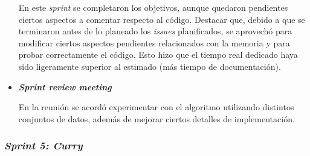 \begin{itemize}
	En este \textit{sprint} se completaron los objetivos, aunque quedaron pendientes ciertos aspectos a comentar respecto al código. Destacar que, debido a que se terminaron antes de lo planeado los \textit{issues} planificados, se aprovechó para modificar ciertos aspectos pendientes relacionados con la memoria y para probar correctamente el código. Esto hizo que el tiempo real dedicado haya sido ligeramente superior al estimado (más tiempo de documentación).
	
	\item \textbf{\textit{Sprint review meeting}}
	
	En la reunión se acordó experimentar con el algoritmo utilizando distintos conjuntos de datos, además de mejorar ciertos detalles de implementación.
	
\end{itemize}

\subsubsection{\textit{Sprint 5: Curry}}

